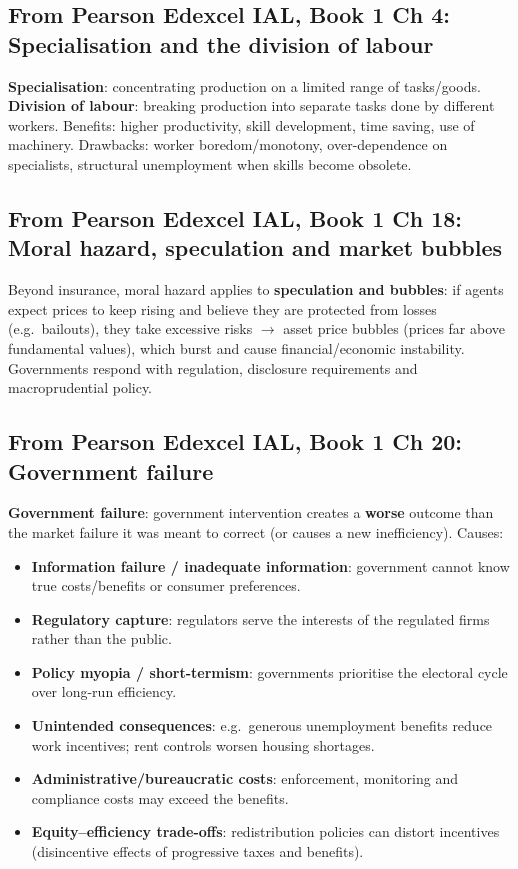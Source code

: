 \documentclass[a4paper,12pt]{article}
\newcommand{\needbold}[1]{\textcolor{red!70!black}{\textbf{#1}}}
\begin{document}
\subsection*{From Pearson Edexcel IAL, Book 1 Ch 4: Specialisation and the division of labour}
\needbold{Specialisation}: concentrating production on a limited range of tasks/goods. \needbold{Division of labour}: breaking production into separate tasks done by different workers. Benefits: higher productivity, skill development, time saving, use of machinery. Drawbacks: worker boredom/monotony, over-dependence on specialists, structural unemployment when skills become obsolete.

\subsection*{From Pearson Edexcel IAL, Book 1 Ch 18: Moral hazard, speculation and market bubbles}
Beyond insurance, moral hazard applies to \textbf{speculation and bubbles}: if agents expect prices to keep rising and believe they are protected from losses (e.g.\ bailouts), they take excessive risks $\to$ asset price bubbles (prices far above fundamental values), which burst and cause financial/economic instability. Governments respond with regulation, disclosure requirements and macroprudential policy.

\subsection*{From Pearson Edexcel IAL, Book 1 Ch 20: Government failure}\label{sec:add-govfail}
\needbold{Government failure}: government intervention creates a \textbf{worse} outcome than the market failure it was meant to correct (or causes a new inefficiency). Causes:
\begin{itemize}
  \item \textbf{Information failure / inadequate information}: government cannot know true costs/benefits or consumer preferences.
  \item \textbf{Regulatory capture}: regulators serve the interests of the regulated firms rather than the public.
  \item \textbf{Policy myopia / short-termism}: governments prioritise the electoral cycle over long-run efficiency.
  \item \textbf{Unintended consequences}: e.g.\ generous unemployment benefits reduce work incentives; rent controls worsen housing shortages.
  \item \textbf{Administrative/bureaucratic costs}: enforcement, monitoring and compliance costs may exceed the benefits.
  \item \textbf{Equity--efficiency trade-offs}: redistribution policies can distort incentives (disincentive effects of progressive taxes and benefits).
\end{itemize}
\end{document}
